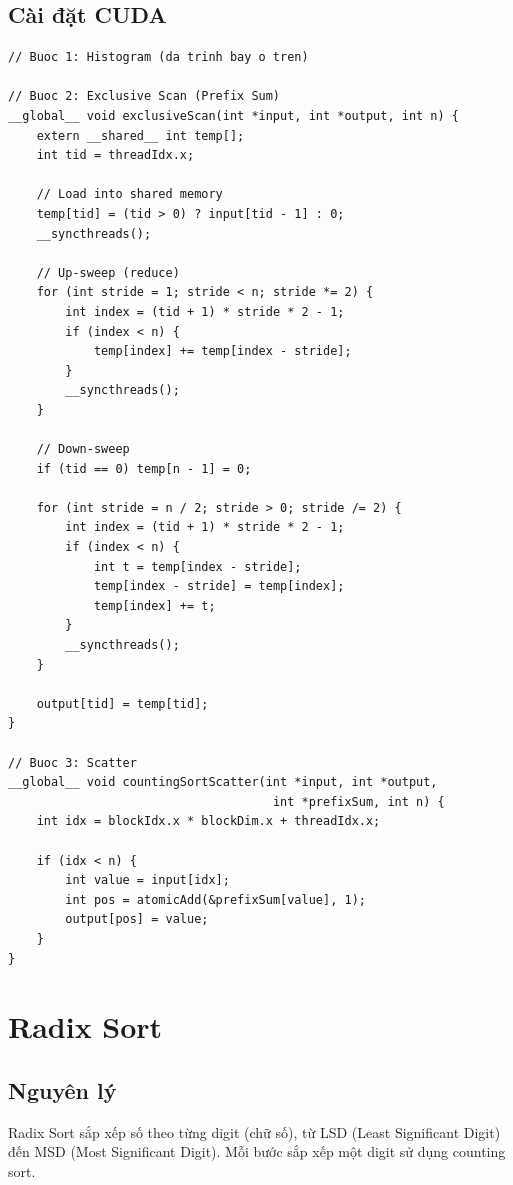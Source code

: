 \subsection{Cài đặt CUDA}

\begin{lstlisting}[caption={Counting Sort với CUDA}, label={lst:counting_sort_cuda}]
// Buoc 1: Histogram (da trinh bay o tren)

// Buoc 2: Exclusive Scan (Prefix Sum)
__global__ void exclusiveScan(int *input, int *output, int n) {
    extern __shared__ int temp[];
    int tid = threadIdx.x;
    
    // Load into shared memory
    temp[tid] = (tid > 0) ? input[tid - 1] : 0;
    __syncthreads();
    
    // Up-sweep (reduce)
    for (int stride = 1; stride < n; stride *= 2) {
        int index = (tid + 1) * stride * 2 - 1;
        if (index < n) {
            temp[index] += temp[index - stride];
        }
        __syncthreads();
    }
    
    // Down-sweep
    if (tid == 0) temp[n - 1] = 0;
    
    for (int stride = n / 2; stride > 0; stride /= 2) {
        int index = (tid + 1) * stride * 2 - 1;
        if (index < n) {
            int t = temp[index - stride];
            temp[index - stride] = temp[index];
            temp[index] += t;
        }
        __syncthreads();
    }
    
    output[tid] = temp[tid];
}

// Buoc 3: Scatter
__global__ void countingSortScatter(int *input, int *output, 
                                     int *prefixSum, int n) {
    int idx = blockIdx.x * blockDim.x + threadIdx.x;
    
    if (idx < n) {
        int value = input[idx];
        int pos = atomicAdd(&prefixSum[value], 1);
        output[pos] = value;
    }
}
\end{lstlisting}

\section{Radix Sort}

\subsection{Nguyên lý}

Radix Sort sắp xếp số theo từng digit (chữ số), từ LSD (Least Significant Digit) đến MSD (Most Significant Digit). Mỗi bước sắp xếp một digit sử dụng counting sort.

